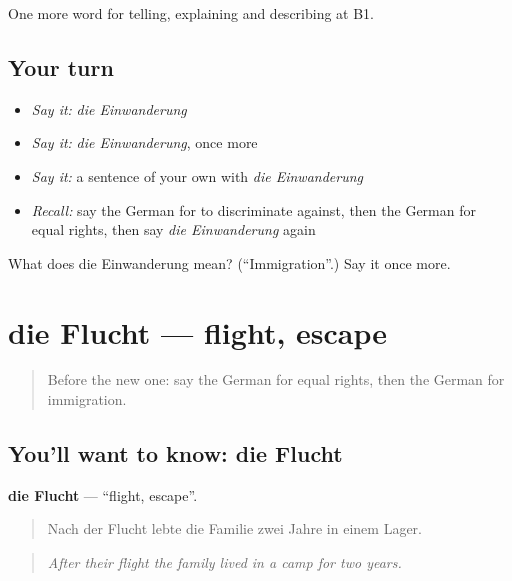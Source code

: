\begin{grammarlens}[title={What you've built}]
One more word for telling, explaining and describing at B1.
\end{grammarlens}

\subsection*{Your turn}
\begin{itemize}
\raggedright
  \item \emph{Say it:} \emph{die Einwanderung}
  \item \emph{Say it:} \emph{die Einwanderung}, once more
  \item \emph{Say it:} a sentence of your own with \emph{die Einwanderung}
  \item \emph{Recall:} say the German for to discriminate against, then the German for equal rights, then say \emph{die Einwanderung} again
\end{itemize}

\begin{tcolorbox}[breakable,colback=teal!4,colframe=teal!35!black,title={Before you move on}]
What does die Einwanderung mean? (\textquotedblleft{}Immigration\textquotedblright{}.) Say it once more.
\end{tcolorbox}
\section[die Flucht]{die Flucht — flight, escape}

\label{lesson:GE-C361-flucht}



\begin{quote}
Before the new one: say the German for equal rights, then the German for immigration.
\end{quote}

\subsection*{You'll want to know: die Flucht}
\textbf{die Flucht} — \textquotedblleft{}flight, escape\textquotedblright{}.

\begin{quote}
Nach der Flucht lebte die Familie zwei Jahre in einem Lager.
\end{quote}

\begin{quote}
\emph{After their flight the family lived in a camp for two years.}
\end{quote}

